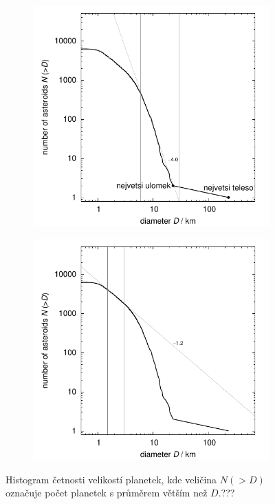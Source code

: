 \documentclass[A4paper, 12pt, oneside]{book}
\begin{document}
\begin{figure}[!htb]
	\centering
	\begin{subfigure}[b]{0.45\textwidth}
	\includegraphics[width=\textwidth]{obr/size_distribution}
	\end{subfigure}
	\begin{subfigure}[b]{0.45\textwidth}
	\includegraphics[width=\textwidth]{obr/size_distribution_SMALLD}
	\end{subfigure}
	\caption{Histogram četnosti velikostí planetek, kde veličina $N(>D)$ označuje počet planetek s průměrem větším než $D$.???}
	\label{size_distribution}
\end{figure}
\end{document}
